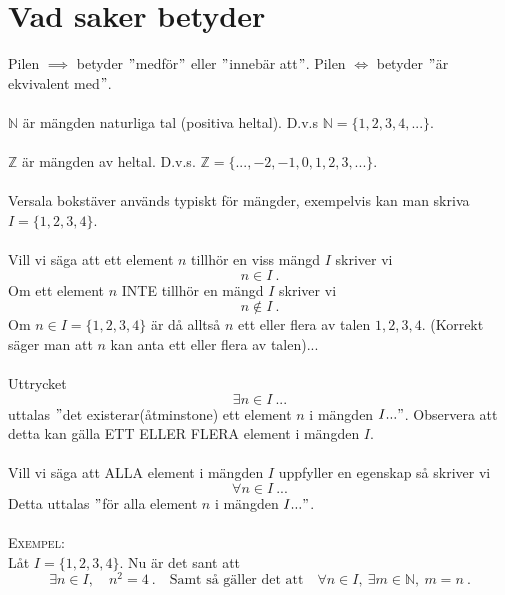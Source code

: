 \documentclass{article}
\begin{document}
\section*{Vad saker betyder}
Pilen $\implies$ betyder $"$medför$"$ eller $"$innebär att$"$. Pilen $\Longleftrightarrow$ betyder $"$är ekvivalent med$"$.
\\ \\
$\mathbb{N}$ är mängden naturliga tal (positiva heltal). D.v.s $\mathbb{N}=\{1,2,3,4,...\}$. 
\\ \\
$\mathbb{Z}$ är mängden av heltal. D.v.s. $\mathbb{Z}=\{...,-2,-1,0,1,2,3,...\}$.
\\ \\
Versala bokstäver används typiskt för mängder, exempelvis kan man skriva $I=\{1,2,3,4\}$.
\\ \\
Vill vi säga att ett element $n$ tillhör en viss mängd $I$ skriver vi 
\begin{equation*}
    n\in I \ .
\end{equation*}
Om ett element $n$ INTE tillhör en mängd $I$ skriver vi
\begin{equation*}
    n \notin I \ .
\end{equation*}
Om $n\in I=\{1,2,3,4\}$ är då alltså $n$ ett eller flera av talen $1,2,3,4$. (Korrekt säger man att $n$ kan anta ett eller flera av talen)...
\\ \\
Uttrycket
\begin{equation*}
    \exists n\in I \ ...
\end{equation*}
uttalas $"$det existerar(åtminstone) ett element $n$ i mängden $I..."$. Observera att detta kan gälla ETT ELLER FLERA element i mängden $I$.
\\ \\
Vill vi säga att ALLA element i mängden $I$ uppfyller en egenskap så skriver vi
\begin{equation*}
    \forall n\in I \ ...
\end{equation*}
Detta uttalas $"$för alla element $n$ i mängden $I..."$.
\\ \\
\textsc{Exempel:}
\\
Låt $I=\{1,2,3,4\}$. Nu är det sant att
\begin{equation*}
    \exists n\in I, \quad n^2=4 \ . \quad \textrm{Samt så gäller det att} \quad \forall n\in I, \ \exists m\in\mathbb{N}, \ m=n \ .    
\end{equation*}
\end{document}
